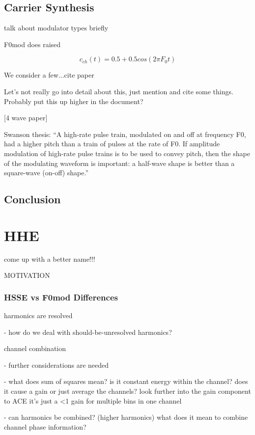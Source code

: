\documentclass [11pt, proquest] {uwthesis}[2015/03/03]
\begin{document}
 


\section{Carrier Synthesis}

talk about modulator types briefly

F0mod does raised

$$c_{ch}(t) = 0.5 + 0.5cos(2\pi F_0t)$$


We consider a few...cite paper

Let's not really go into detail about this, just mention and cite some things.  Probably put this up higher in the document?

[4 wave paper]

Swanson thesis: ``A high-rate pulse train, modulated on and off at frequency F0, had a higher pitch than a train of pulses at the rate of F0. If amplitude modulation of high-rate pulse trains is to be used to convey pitch, then the shape of the modulating waveform is important: a half-wave shape is better than a square-wave (on-off) shape.''


\section{Conclusion}



\chapter{HHE}
come up with a better name!!!

MOTIVATION

\subsection{HSSE vs F0mod Differences}

harmonics are resolved

 - how do we deal with should-be-unresolved harmonics?

channel combination

 - further considerations are needed

 - what does sum of squares mean? is it constant energy within the channel?  does it cause a gain or just average the channels?  look further into the gain component to ACE
 	it's just a <1 gain for multiple bins in one channel

 - can harmonics be combined? (higher harmonics) what does it mean to combine channel phase information?
\end{document}
